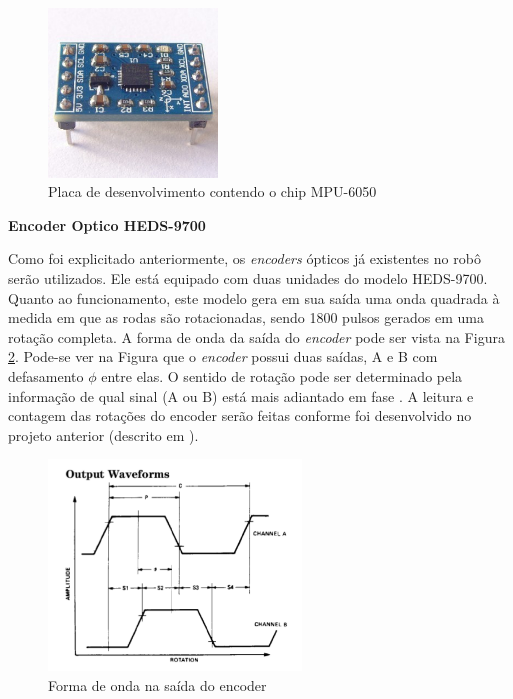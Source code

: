 \begin{figure}[H]
\centering
\includegraphics[width=0.4\textwidth]{./figuras/quali/mpu6050.JPG}
\caption{Placa de desenvolvimento contendo o chip MPU-6050}
\label{fig:mpu6050}
\end{figure}

\textbf{Encoder Optico HEDS-9700}

Como foi explicitado anteriormente, os \textit{encoders} ópticos já existentes no robô serão utilizados. Ele está equipado com duas unidades do modelo HEDS-9700.
Quanto ao funcionamento, este modelo gera em sua saída uma onda quadrada à medida em que as rodas são rotacionadas, sendo 1800 pulsos gerados em uma rotação completa. A forma de onda da saída do \textit{encoder} pode ser vista na Figura \ref{fig:heds9700}. Pode-se ver na Figura que o \textit{encoder} possui duas saídas, A e B com defasamento $\phi$ entre elas. O sentido de rotação pode ser determinado pela informação de qual sinal (A ou B) está mais adiantado em fase \cite{heds9700}. A leitura e contagem das rotações do encoder serão feitas conforme foi desenvolvido no projeto anterior (descrito em ).

\begin{figure}[H]
\centering
\includegraphics[width=0.6\textwidth]{./figuras/quali/heds9700.png}
\caption{Forma de onda na saída do encoder}
\label{fig:heds9700}
\end{figure}

